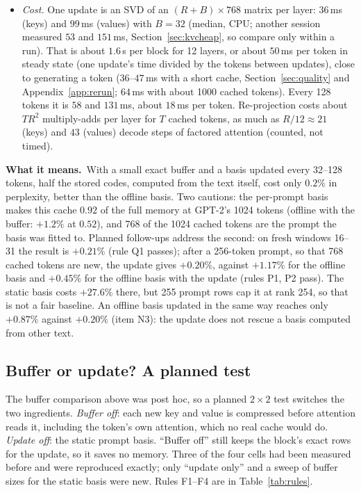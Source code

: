 \documentclass[10pt]{article}
\theoremstyle{plain}
\theoremstyle{definition}
\theoremstyle{remark}
\newcommand{\means}{\noindent\textbf{What it means.}\ }
\newcommand{\rl}[1]{\textsf{#1}}%
\begin{document}
\begin{itemize}[leftmargin=2em,itemsep=1pt]
\item \emph{Cost.} One update is an SVD of an $(R+B)\times768$ matrix per layer: $36$\,ms (keys) and $99$\,ms (values) with $B=32$ (median, CPU; another session measured $53$ and $151$\,ms, Section~\ref{sec:kvcheap}, so compare only within a run). That is about $1.6$\,s per block for 12 layers, or about $50$\,ms per token in steady state (one update's time divided by the tokens between updates), close to generating a token ($36$--$47$\,ms with a short cache, Section~\ref{sec:quality} and Appendix~\ref{app:rerun}; $64$\,ms with about 1000 cached tokens). Every 128 tokens it is $58$ and $131$\,ms, about $18$\,ms per token. Re-projection costs about $TR^2$ multiply-adds per layer for $T$ cached tokens, as much as $R/12\approx21$ (keys) and $43$ (values) decode steps of factored attention (counted, not timed).
\end{itemize}

\means With a small exact buffer and a basis updated every 32--128 tokens, half the stored codes, computed from the text itself, cost only $0.2\%$ in perplexity, better than the offline basis. Two cautions: the per-prompt basis makes this cache $0.92$ of the full memory at GPT-2's 1024 tokens (offline with the buffer: $+1.2\%$ at $0.52$), and 768 of the 1024 cached tokens are the prompt the basis was fitted to. Planned follow-ups address the second: on fresh windows 16--31 the result is $+0.21\%$ (rule \rl{Q1} passes); after a 256-token prompt, so that 768 cached tokens are new, the update gives $+0.20\%$, against $+1.17\%$ for the offline basis and $+0.45\%$ for the offline basis with the update (rules \rl{P1}, \rl{P2} pass). The static basis costs $+27.6\%$ there, but 255 prompt rows cap it at rank 254, so that is not a fair baseline. An offline basis updated in the same way reaches only $+0.87\%$ against $+0.20\%$ (item \rl{N3}): the update does not rescue a basis computed from other text.

\subsection{Buffer or update? A planned test}
\label{sec:kvbuffer}

The buffer comparison above was post hoc, so a planned $2\times2$ test switches the two ingredients. \emph{Buffer off}: each new key and value is compressed before attention reads it, including the token's own attention, which no real cache would do. \emph{Update off}: the static prompt basis. ``Buffer off'' still keeps the block's exact rows for the update, so it saves no memory. Three of the four cells had been measured before and were reproduced exactly; only ``update only'' and a sweep of buffer sizes for the static basis were new. Rules \rl{F1}--\rl{F4} are in Table~\ref{tab:rules}.
\end{document}
